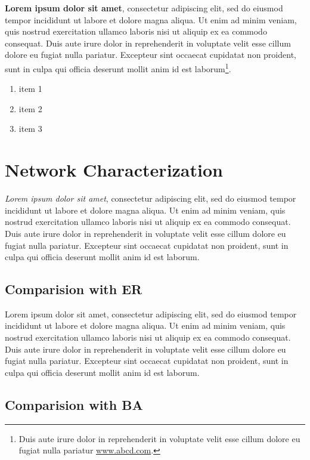 \documentclass[sigchi]{acmart}
\begin{document}
{\bf Lorem ipsum dolor sit amet}, consectetur adipiscing elit, sed do eiusmod tempor incididunt ut labore et dolore magna aliqua. Ut enim ad minim veniam, quis nostrud exercitation ullamco laboris nisi ut aliquip ex ea commodo consequat. Duis aute irure dolor in reprehenderit in voluptate velit esse cillum dolore eu fugiat nulla pariatur. Excepteur sint occaecat cupidatat non proident, sunt in culpa qui officia deserunt mollit anim id est laborum\footnote{Duis aute irure dolor in reprehenderit in voluptate velit esse cillum dolore eu fugiat nulla pariatur \url{www.abcd.com}.}.

\begin{enumerate}
\item item 1
\item item 2
\item item 3
\end{enumerate}

\section{Network Characterization}

{\em Lorem ipsum dolor sit amet}, consectetur adipiscing elit, sed do eiusmod tempor incididunt ut labore et dolore magna aliqua. Ut enim ad minim veniam, quis nostrud exercitation ullamco laboris nisi ut aliquip ex ea commodo consequat. Duis aute irure dolor in reprehenderit in voluptate velit esse cillum dolore eu fugiat nulla pariatur. Excepteur sint occaecat cupidatat non proident, sunt in culpa qui officia deserunt mollit anim id est laborum.

\subsection{Comparision with ER}

Lorem ipsum dolor sit amet, consectetur adipiscing elit, sed do eiusmod tempor incididunt ut labore et dolore magna aliqua. Ut enim ad minim veniam, quis nostrud exercitation ullamco laboris nisi ut aliquip ex ea commodo consequat. Duis aute irure dolor in reprehenderit in voluptate velit esse cillum dolore eu fugiat nulla pariatur. Excepteur sint occaecat cupidatat non proident, sunt in culpa qui officia deserunt mollit anim id est laborum.

\subsection{Comparision with BA}
\end{document}
